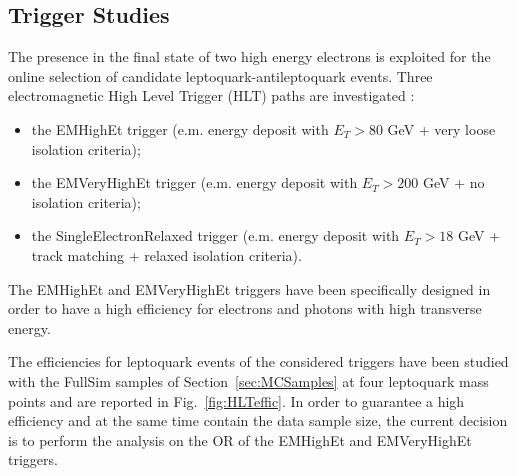 \documentclass{cmspaper}
\begin{document}
\begin{linenumbers}
\section{Trigger Studies} \label{sec:trig}

The presence in the final state of two high energy electrons is exploited for the online selection 
of candidate leptoquark-antileptoquark events. 
Three electromagnetic High Level Trigger (HLT) paths are investigated
:
\begin{itemize}
\item the EMHighEt trigger (e.m. energy deposit with $E_{T}>80$ GeV + very loose isolation criteria);
\item the EMVeryHighEt  trigger (e.m. energy deposit with $E_{T}>200$ GeV + no isolation criteria);
\item the SingleElectronRelaxed trigger (e.m. energy deposit with $E_{T}>18$ GeV + track matching + relaxed isolation criteria).
\end{itemize}

The EMHighEt and EMVeryHighEt triggers have been specifically designed in order to have a high 
efficiency for electrons and photons with high transverse energy\cite{HLT_HE_VHE}. 

The efficiencies for leptoquark events of the considered triggers have been studied with the FullSim 
samples of Section~\ref{sec:MCSamples} at four leptoquark mass points and are reported in 
Fig.~\ref{fig:HLTeffic}.
In order to guarantee a high efficiency and at the same time contain the data sample size, the current decision is to perform the analysis on the OR of the EMHighEt and EMVeryHighEt triggers.


\end{linenumbers}
\end{document}
